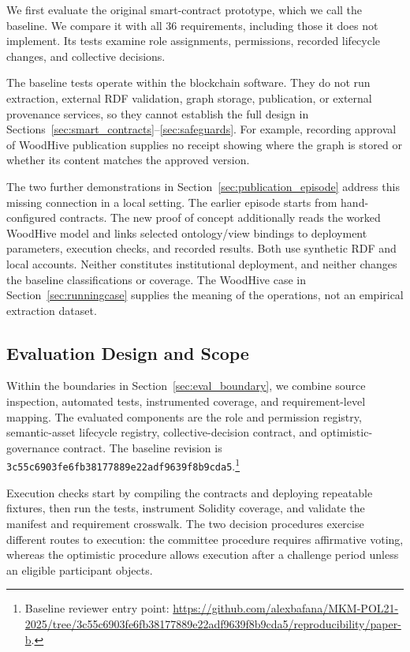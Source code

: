 \documentclass[journal]{IEEEtran}
\begin{document}
We first evaluate the original smart-contract prototype,
which we call the baseline. We compare it with all 36
requirements, including those it does not implement.
Its tests examine role assignments, permissions, recorded
lifecycle changes, and collective decisions.

The baseline tests operate within the blockchain software. They do
not run extraction, external RDF validation, graph storage, publication,
or external provenance services, so they cannot establish the full design in
Sections~\ref{sec:smart_contracts}--\ref{sec:safeguards}. For example,
recording approval of WoodHive publication supplies no receipt showing
where the graph is stored or whether its content matches the approved version.

The two further demonstrations in Section~\ref{sec:publication_episode}
address this missing connection in a local setting. The earlier episode
starts from hand-configured contracts. The new proof of concept additionally
reads the worked WoodHive model and links selected ontology/view bindings
to deployment parameters, execution checks, and recorded results.
Both use synthetic RDF and local accounts. Neither constitutes institutional
deployment, and neither changes the baseline classifications or coverage.
The WoodHive case in Section~\ref{sec:runningcase} supplies the meaning
of the operations, not an empirical extraction dataset.

\subsection{Evaluation Design and Scope}
\label{sec:eval_method}

Within the boundaries in Section~\ref{sec:eval_boundary}, we combine source inspection, automated tests, instrumented coverage, and requirement-level mapping. The evaluated components are the role and permission registry, semantic-asset lifecycle registry, collective-decision contract, and optimistic-governance contract. The baseline revision is \texttt{3c55c6903fe6fb38177889e22adf9639f8b9cda5}.\footnote{Baseline reviewer entry point: \url{https://github.com/alexbafana/MKM-POL21-2025/tree/3c55c6903fe6fb38177889e22adf9639f8b9cda5/reproducibility/paper-b}.}

Execution checks start by compiling the contracts and deploying repeatable
fixtures, then run the tests, instrument Solidity coverage, and validate
the manifest and requirement crosswalk. The two decision procedures
exercise different routes to execution: the committee procedure requires
affirmative voting, whereas the optimistic procedure allows execution
after a challenge period unless an eligible participant objects.
\end{document}
